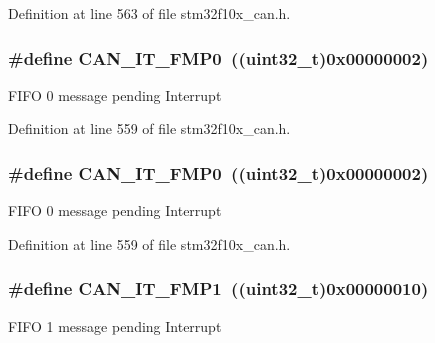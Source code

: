 Definition at line 563 of file stm32f10x\+\_\+can.\+h.

\subsubsection[{\texorpdfstring{C\+A\+N\+\_\+\+I\+T\+\_\+\+F\+M\+P0}{CAN_IT_FMP0}}]{\setlength{\rightskip}{0pt plus 5cm}\#define C\+A\+N\+\_\+\+I\+T\+\_\+\+F\+M\+P0~(({\bf uint32\+\_\+t})0x00000002)}\hypertarget{group___c_a_n__interrupts_ga3fe6fbf53e9d692957e87ad329bcd362}{}\label{group___c_a_n__interrupts_ga3fe6fbf53e9d692957e87ad329bcd362}
F\+I\+FO 0 message pending Interrupt 

Definition at line 559 of file stm32f10x\+\_\+can.\+h.

\subsubsection[{\texorpdfstring{C\+A\+N\+\_\+\+I\+T\+\_\+\+F\+M\+P0}{CAN_IT_FMP0}}]{\setlength{\rightskip}{0pt plus 5cm}\#define C\+A\+N\+\_\+\+I\+T\+\_\+\+F\+M\+P0~(({\bf uint32\+\_\+t})0x00000002)}\hypertarget{group___c_a_n__interrupts_ga3fe6fbf53e9d692957e87ad329bcd362}{}\label{group___c_a_n__interrupts_ga3fe6fbf53e9d692957e87ad329bcd362}
F\+I\+FO 0 message pending Interrupt 

Definition at line 559 of file stm32f10x\+\_\+can.\+h.

\subsubsection[{\texorpdfstring{C\+A\+N\+\_\+\+I\+T\+\_\+\+F\+M\+P1}{CAN_IT_FMP1}}]{\setlength{\rightskip}{0pt plus 5cm}\#define C\+A\+N\+\_\+\+I\+T\+\_\+\+F\+M\+P1~(({\bf uint32\+\_\+t})0x00000010)}\hypertarget{group___c_a_n__interrupts_gaa0e101053fb203629e0e9a954213e71e}{}\label{group___c_a_n__interrupts_gaa0e101053fb203629e0e9a954213e71e}
F\+I\+FO 1 message pending Interrupt 

